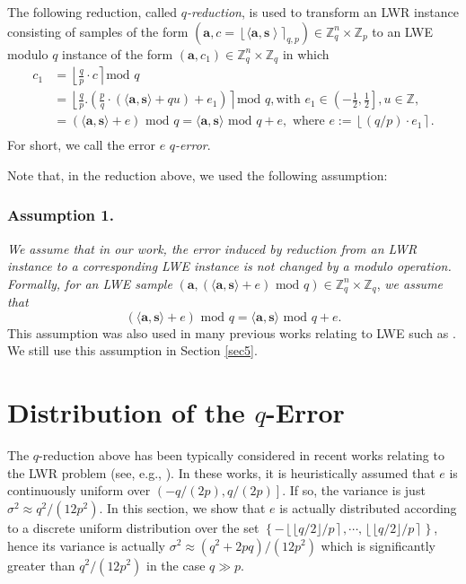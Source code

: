 \documentclass[runningheads]{llncs}
\begin{document}
The following reduction, called \textit{$q$-reduction}, is used to transform an LWR instance consisting of samples of the form
$(\mathbf{a}, c=\left\lfloor \langle \mathbf{a}, \mathbf{s} \right \rangle \rceil_{q,p}) \in \mathbb{Z}_q^{n} \times \mathbb{Z}_p$ to an LWE modulo $q$ instance of the form $(\mathbf{a},c_1) \in \mathbb{Z}_q^{n} \times \mathbb{Z}_q$ in which
\begin{equation} \label{eq4}
\begin{split}
c_1&=\left \lfloor \frac{q}{p} \cdot c \right \rceil \text{mod } q\\
&=\left \lfloor \frac{q}{p}.\left(\frac{p}{q} \cdot (\langle \mathbf{a}, \mathbf{s} \rangle+qu) +e_1 \right)\right\rceil \text{mod } q, \text{with } e_1 \in \left( -\frac{1}{2},\frac{1}{2} \right], u \in \mathbb{Z}, \\
&=(\langle \mathbf{a}, \mathbf{s} \rangle +e)\text{ mod } q=\langle \mathbf{a}, \mathbf{s} \rangle \text{ mod } q+e, \text{ where } e:=\left \lfloor (q/p) \cdot e_1 \right \rceil.\\
\end{split}	
\end{equation}
For short, we call the error $e$ \textit{$q$-error}.

Note that, in the reduction above, we used the following assumption:
\subsubsection{Assumption 1.} \textit{We assume that in our work, the error induced by reduction from an LWR instance to a corresponding LWE instance is not changed by a modulo operation. 
Formally, for an LWE sample} $(\mathbf{a},(\langle \mathbf{a}, \mathbf{s} \rangle +e)\text{ mod } q) \in \mathbb{Z}_q^{n} \times \mathbb{Z}_q$, \textit{we assume that} $$(\langle \mathbf{a}, \mathbf{s} \rangle +e)\text{ mod } q=\langle \mathbf{a}, \mathbf{s} \rangle \text{ mod } q+e.$$
This assumption was also used in many previous works relating to LWE such as \cite{BGV12, BV11a,BV11b,KYGY16, LL15}. We still use this assumption in Section \ref{sec5}.
\section{Distribution of the $q$-Error}\label{sec3}

	The $q$-reduction above has been typically considered in recent works relating to the LWR problem (see, e.g., \cite{BBGM+17,CKLS16, FLX+16}).  In these works, it is heuristically assumed that $e$ is continuously uniform over $\left( -{q}/(2p),{q}/(2p) \right]$. If so, the variance is just $\sigma^2 \approx {q^2}/{(12p^2)}$. In this section, we show that $ e $ is actually distributed according to a discrete uniform distribution over the set $\left\{ -\left\lfloor{\lfloor q/2 \rfloor}/{p} \right \rceil, \cdots, \left\lfloor {\lfloor q/2 \rfloor}/{p} \right \rceil \right\}$, hence its variance is actually $\sigma^2\approx (q^2+2pq)/(12p^2)$ which is significantly greater than $q^2/(12p^2)$ in the case $q \gg p$.
	
\end{document}
